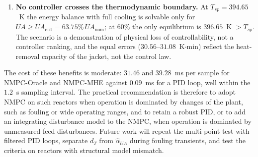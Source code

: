 \begin{enumerate}
    \item \textbf{No controller crosses the thermodynamic boundary.} At $T_{sp} = 394.65$~K the energy balance with full cooling is solvable only for $UA \ge UA_{\mathrm{crit}} = 63.75\%\,UA_{\mathrm{nom}}$; at $60\%$ the only equilibrium is $396.65$~K $> T_{sp}$. The scenario is a demonstration of physical loss of controllability, not a controller ranking, and the equal errors ($30.56$--$31.08$~K$\cdot$min) reflect the heat-removal capacity of the jacket, not the control law.
\end{enumerate}
The cost of these benefits is moderate: $31.46$ and $39.28$~ms per sample for NMPC-Oracle and NMPC-MHE against $0.09$~ms for a PID loop, well within the $1.2$~s sampling interval. The practical recommendation is therefore to adopt NMPC on such reactors when operation is dominated by changes of the plant, such as fouling or wide operating ranges, and to retain a robust PID, or to add an integrating disturbance model to the NMPC, when operation is dominated by unmeasured feed disturbances. Future work will repeat the multi-point test with filtered PID loops, separate $d_T$ from $\hat\alpha_{UA}$ during fouling transients, and test the criteria on reactors with structural model mismatch.
